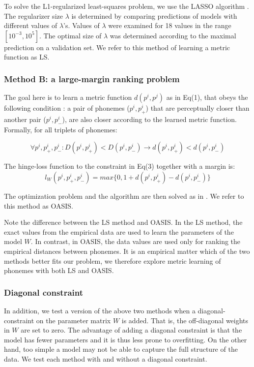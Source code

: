 To solve the L1-regularized least-squares problem, we use the LASSO algorithm \citep{Tibshirani1996}. The regularizer size $\lambda$ is determined by comparing predictions of models with different values of $\lambda$'s. Values of $\lambda$ were examined for 18 values in the range $[10^{-3}, 10^5]$. The optimal size of $\lambda$ was determined according to the maximal prediction on a validation set. We refer to this method of learning a metric function as LS.

\subsubsection{Method B: a large-margin ranking problem} The goal here is to learn a metric function $d(p^i, p^j)$ as in Eq(1), that obeys the following condition \citep{Chechik2010}: a pair of phonemes ($p^i, p^i_+$) that are perceptually closer than another pair ($p^i, p^i_-$), are also closer according to the learned metric function. Formally, for all triplets of phonemes:

\begin{equation}
\forall{p^i, p^i_+, p^i_-}: D(p^i, p^i_+)<D(p^i, p^i_-) \rightarrow d(p^i, p^i_+)<d(p^i, p^i_-)
\end{equation}

The hinge-loss function to the constraint in Eq(3) together with a margin is:
\begin{equation}
    l_W(p^i, p^i_+, p^i_-) = max\{0, 1 + d(p^i, p^i_+) - d(p^i, p^i_-)\}
\end{equation}

The optimization problem and the algorithm are then solved as in \citet{Chechik2010}. We refer to this method as OASIS.

Note the difference between the LS method and OASIS. In the LS method, the exact values from the empirical data are used to learn the parameters of the model $W$. In contrast, in OASIS, the data values are used only for ranking the empirical distances between phonemes. It is an empirical matter which of the two methods better fits our problem, we therefore explore metric learning of phonemes with both LS and OASIS.

\subsubsection{Diagonal constraint} In addition, we test a version of the above two methods when a diagonal-constraint on the parameter matrix $W$ is added. That is, the off-diagonal weights in $W$ are set to zero. The advantage of adding a diagonal constraint is that the model has fewer parameters and it is thus less prone to overfitting. On the other hand, too simple a model may not be able to capture the full structure of the data. We test each method with and without a diagonal constraint. 

